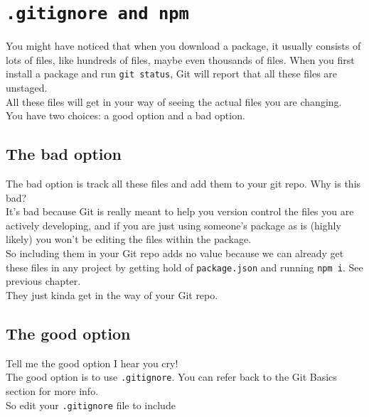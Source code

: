 \section{\texttt{.gitignore and npm}}

You might have noticed that when you download a package, it usually consists of lots of files, like hundreds of files, maybe even thousands of files. When you first install a package and run \texttt{git status}, Git will report that all these files are unstaged. 
\\

All these files will get in your way of seeing the actual files you are changing.
\\

You have two choices: a good option and a bad option.
\\

\subsection{The bad option}
The bad option is track all these files and add them to your git repo. Why is this bad?
\\

It's bad because Git is really meant to help you version control the files you are actively developing, and if you are just using someone's package as is (highly likely) you won't be editing the files within the package.
\\

So including them in your Git repo adds no value because we can already get these files in any project by getting hold of \texttt{package.json} and running \texttt{npm i}. See previous chapter.
\\

They just kinda get in the way of your Git repo.
\\

\subsection{The good option}

Tell me the good option I hear you cry!
\\

The good option is to use \texttt{.gitignore}. You can refer back to the Git Basics section for more info.
\\

So edit your \texttt{.gitignore} file to include 
\\

